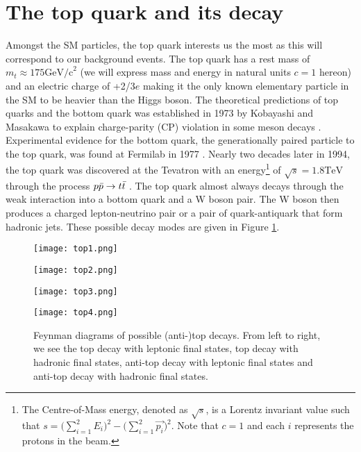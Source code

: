 \section{The top quark and its decay}
Amongst the SM particles, the top quark interests us the most as this will correspond to our background events.  The top quark has a rest mass of $m_t\approx175\text{GeV/c}^2$ (we will express mass and energy in natural units $c=1$ hereon) and an electric charge of +2/3$e$ \cite{tanabashi2018review} making it the only known elementary particle in the SM to be heavier than the Higgs boson. The theoretical predictions of top quarks and the bottom quark was established in 1973 by Kobayashi and Masakawa to explain charge-parity (CP) violation in some meson decays \cite{griffiths2008introduction, kobayashi1973cp}. Experimental evidence for the bottom quark, the generationally paired particle to the top quark, was found at Fermilab in 1977 \cite{herb1977observation}. Nearly two decades later in 1994, the top quark was discovered at the Tevatron with an energy\footnote{The Centre-of-Mass energy, denoted as $\sqrt{s}$, is a Lorentz invariant value such that $s=\Big( \sum\limits_{i=1}^2 E_i \Big)^2 - \Big( \sum\limits_{i=1}^2 \overrightarrow{p_i} \Big)^2 $. Note that $c=1$ and each $i$ represents the protons in the beam.} of $\sqrt{s}=1.8\text{TeV}$ through the process $p\Bar{p} \rightarrow t\Bar{t}$ \cite{abachi1994search, coll1994evidence, abachi1995observation}. The top quark almost always decays through the weak interaction into a bottom quark and a W boson pair. The W boson then produces a charged lepton-neutrino pair or a pair of quark-antiquark that form hadronic jets. These possible decay modes are given in Figure \ref{fig:topdecay}. \\

\begin{figure}[htbp]
    \centering
    \begin{minipage}{0.24\linewidth}
        \texttt{[image: top1.png]}
        \label{fig:top1}
    \end{minipage}
    \begin{minipage}{0.24\linewidth}
        \texttt{[image: top2.png]}
        \label{fig:anttop1}
    \end{minipage}
    \begin{minipage}{0.24\linewidth}
        \texttt{[image: top3.png]}
        \label{fig:top2}
    \end{minipage}
    \begin{minipage}{0.24\linewidth}
        \texttt{[image: top4.png]}
        \label{fig:anttop2}
    \end{minipage}
    \caption{Feynman diagrams of possible (anti-)top decays. From left to right, we see the top decay with leptonic final states, top decay with hadronic final states, anti-top decay with leptonic final states and anti-top decay with hadronic final states.}
    \label{fig:topdecay}
\end{figure}

